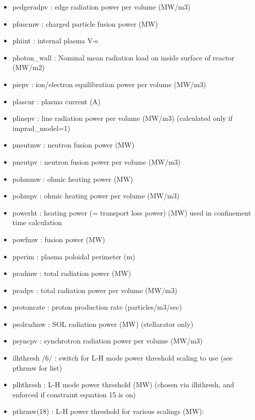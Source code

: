 \documentclass[]{article}
\begin{document}
\begin{itemize}
\item
  pedgeradpv : edge radiation power per volume (MW/m3)
\item
  pfuscmw : charged particle fusion power (MW)
\item
  phiint : internal plasma V-s
\item
  photon\_wall : Nominal mean radiation load on inside surface of
  reactor (MW/m2)
\item
  piepv : ion/electron equilibration power per volume (MW/m3)
\item
  plascur : plasma current (A)
\item
  plinepv : line radiation power per volume (MW/m3) (calculated only if
  imprad\_model=1)
\item
  pneutmw : neutron fusion power (MW)
\item
  pneutpv : neutron fusion power per volume (MW/m3)
\item
  pohmmw : ohmic heating power (MW)
\item
  pohmpv : ohmic heating power per volume (MW/m3)
\item
  powerht : heating power (= transport loss power) (MW) used in
  confinement time calculation
\item
  powfmw : fusion power (MW)
\item
  pperim : plasma poloidal perimeter (m)
\item
  pradmw : total radiation power (MW)
\item
  pradpv : total radiation power per volume (MW/m3)
\item
  protonrate : proton production rate (particles/m3/sec)
\item
  psolradmw : SOL radiation power (MW) (stellarator only)
\item
  psyncpv : synchrotron radiation power per volume (MW/m3)
\item
  ilhthresh /6/ : switch for L-H mode power threshold scaling to use
  (see pthrmw for list)
\item
  plhthresh : L-H mode power threshold (MW) (chosen via ilhthresh, and
  enforced if constraint equation 15 is on)
\item
  pthrmw(18) : L-H power threshold for various scalings (MW):


\end{itemize}
\end{document}
